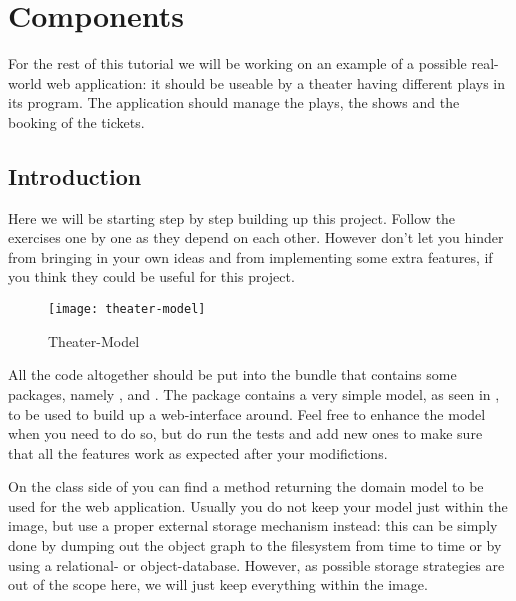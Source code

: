 

\section{Components}

For the rest of this tutorial we will be working on an example of a possible real-world web application: it should be useable by a theater having different plays in its program. The application should manage the plays, the shows and the booking of the tickets.


\subsection{Introduction}
Here we will be starting step by step building up this project. Follow the exercises one by one as they depend on each other. However don't let you hinder from bringing in your own ideas and from implementing some extra features, if you think they could be useful for this project.

\begin{figure}[htbp]
\begin{center}
	\texttt{[image: theater-model]}
	\caption{Theater-Model}
	\label{theater-model}
\end{center}
\end{figure}

All the code altogether should be put into the bundle  that contains some packages, namely ,  and . The package  contains a very simple model, as seen in , to be used to build up a web-interface around. Feel free to enhance the model when you need to do so, but do run the tests and add new ones to make sure that all the features work as expected after your modifictions.

On the class side of  you can find a method  returning the domain model to be used for the web application. Usually you do not keep your model just within the image, but use a proper external storage mechanism instead: this can be simply done by dumping out the object graph to the filesystem from time to time or by using a relational- or object-database. However, as possible storage strategies are out of the scope here, we will just keep everything within the image.

